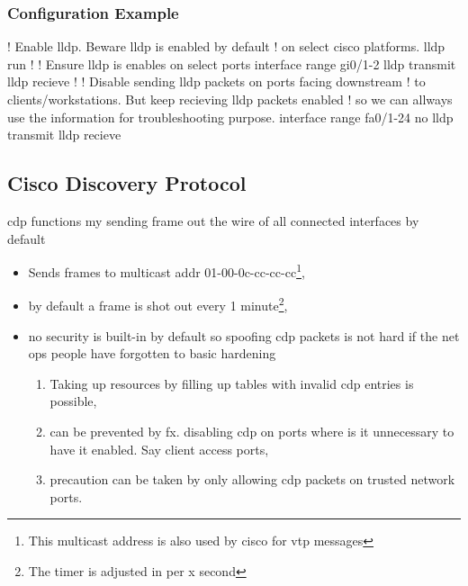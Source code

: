 \subsubsection{Configuration Example}

\begin{cisco}
! Enable lldp. Beware lldp is enabled by default
! on select cisco platforms.
lldp run
!
! Ensure lldp is enables on select ports
interface range gi0/1-2
 lldp transmit
 lldp recieve
!
! Disable sending lldp packets on ports facing downstream
! to clients/workstations. But keep recieving lldp packets enabled
! so we can allways use the information for troubleshooting purpose.
interface range fa0/1-24
 no lldp transmit
 lldp recieve
\end{cisco}

\newpage

\subsection[CDP]{Cisco Discovery Protocol}


\gls{cdp} functions my sending frame out the wire of all connected interfaces by default
\begin{itemize}
    \item Sends frames to multicast addr 01-00-0c-cc-cc-cc\footnote{This multicast address is also used by cisco for \gls{vtp} messages},
    \item by default a frame is shot out every 1 minute\footnote{The timer is adjusted in per x second},
    \item no security is built-in by default so spoofing \gls{cdp} packets is not hard if the net ops people have forgotten to basic hardening
    \begin{enumerate}
        \item Taking up resources by filling up tables with invalid \gls{cdp} entries\cite{wiki:CDP_Spoofing} is possible,
        \item can be prevented by fx. disabling \gls{cdp} on ports where is it unnecessary to have it enabled. Say client access ports,
        \item precaution can be taken by only allowing \gls{cdp} packets on trusted network ports.
    \end{enumerate}
\end{itemize}

